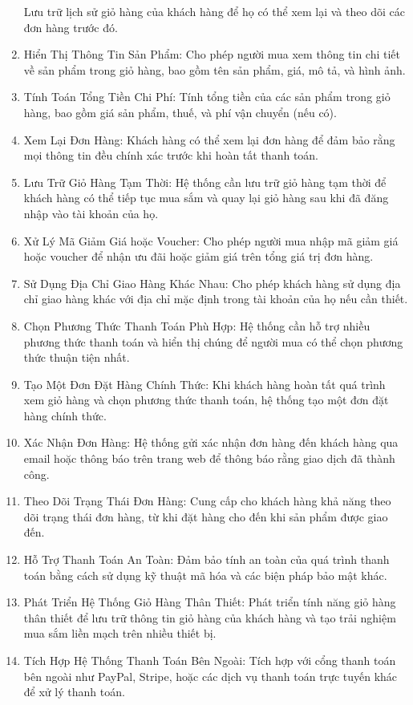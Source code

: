 \begin{enumerate}
        Lưu trữ lịch sử giỏ hàng của khách hàng để họ có thể xem lại và theo dõi các đơn hàng trước đó.
        \item Hiển Thị Thông Tin Sản Phẩm:
        Cho phép người mua xem thông tin chi tiết về sản phẩm trong giỏ hàng, bao gồm tên sản phẩm, giá, mô tả, và hình ảnh.
            \item Tính Toán Tổng Tiền Chi Phí:
        Tính tổng tiền của các sản phẩm trong giỏ hàng, bao gồm giá sản phẩm, thuế, và phí vận chuyển (nếu có).
            \item Xem Lại Đơn Hàng:
        Khách hàng có thể xem lại đơn hàng để đảm bảo rằng mọi thông tin đều chính xác trước khi hoàn tất thanh toán.
            \item Lưu Trữ Giỏ Hàng Tạm Thời:
        Hệ thống cần lưu trữ giỏ hàng tạm thời để khách hàng có thể tiếp tục mua sắm và quay lại giỏ hàng sau khi đã đăng nhập vào tài khoản của họ.
            \item Xử Lý Mã Giảm Giá hoặc Voucher:
        Cho phép người mua nhập mã giảm giá hoặc voucher để nhận ưu đãi hoặc giảm giá trên tổng giá trị đơn hàng.
            \item Sử Dụng Địa Chỉ Giao Hàng Khác Nhau:
        Cho phép khách hàng sử dụng địa chỉ giao hàng khác với địa chỉ mặc định trong tài khoản của họ nếu cần thiết.
            \item Chọn Phương Thức Thanh Toán Phù Hợp:
        Hệ thống cần hỗ trợ nhiều phương thức thanh toán và hiển thị chúng để người mua có thể chọn phương thức thuận tiện nhất.
            \item Tạo Một Đơn Đặt Hàng Chính Thức:
        Khi khách hàng hoàn tất quá trình xem giỏ hàng và chọn phương thức thanh toán, hệ thống tạo một đơn đặt hàng chính thức.
            \item Xác Nhận Đơn Hàng:
        Hệ thống gửi xác nhận đơn hàng đến khách hàng qua email hoặc thông báo trên trang web để thông báo rằng giao dịch đã thành công.
            \item Theo Dõi Trạng Thái Đơn Hàng:
        Cung cấp cho khách hàng khả năng theo dõi trạng thái đơn hàng, từ khi đặt hàng cho đến khi sản phẩm được giao đến.
            \item Hỗ Trợ Thanh Toán An Toàn:
        Đảm bảo tính an toàn của quá trình thanh toán bằng cách sử dụng kỹ thuật mã hóa và các biện pháp bảo mật khác.
            \item Phát Triển Hệ Thống Giỏ Hàng Thân Thiết:
        Phát triển tính năng giỏ hàng thân thiết để lưu trữ thông tin giỏ hàng của khách hàng và tạo trải nghiệm mua sắm liền mạch trên nhiều thiết bị.
            \item Tích Hợp Hệ Thống Thanh Toán Bên Ngoài:
        Tích hợp với cổng thanh toán bên ngoài như PayPal, Stripe, hoặc các dịch vụ thanh toán trực tuyến khác để xử lý thanh toán.
        \end{enumerate}

